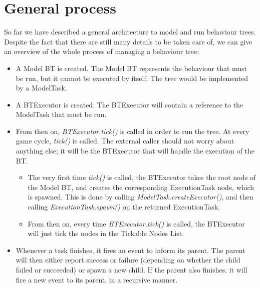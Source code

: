 \documentclass[a4paper,10pt]{article}
\begin{document}
\section{General process}

So far we have described a general architecture to model and run behaviour trees. Despite the fact that there are still many details to be taken care of, we can give an overview of the whole process of managing a behaviour tree:

\begin{itemize}

\item A Model BT is created. The Model BT represents the behaviour that must be run, but it cannot be executed by itself. The tree would be implemented by a ModelTask.

\item A BTExecutor is created. The BTExecutor will contain a reference to the ModelTask that must be run.

\item From then on, \textit{BTExecutor.tick()} is called in order to run the tree. At every game cycle, \textit{tick()} is called. The external caller should not worry about anything else; it will be the BTExecutor that will handle the execution of the BT.

\begin{itemize}

\item The very first time \textit{tick()} is called, the BTExecutor takes the root node of the Model BT, and creates the corresponding ExecutionTask node, which is spawned. This is done by calling \textit{ModelTask.createExecutor()}, and then calling \textit{ExecutionTask.spawn()} on the returned ExecutionTask.

\item From then on, every time \textit{BTExecutor.tick()} is called, the BTExecutor will just tick the nodes in the Tickable Nodes List. 

\end{itemize}

\item Whenever a task finishes, it fires an event to inform its parent. The parent will then either report success or failure (depending on whether the child failed or succeeded) or spawn a new child. If the parent also finishes, it will fire a new event to its parent, in a recursive manner.

\end{itemize}
\end{document}
